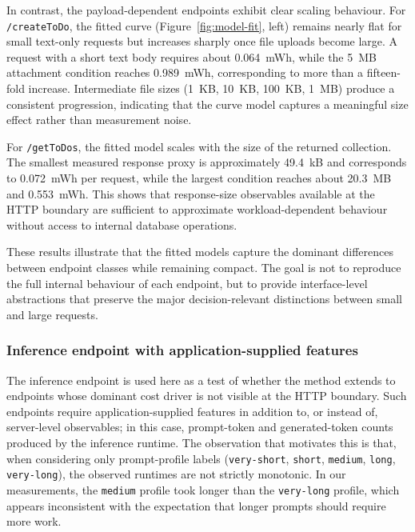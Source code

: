 \documentclass[sigconf]{acmart}
\begin{document}
In contrast, the payload-dependent endpoints exhibit clear scaling behaviour. For \texttt{/createToDo}, the fitted curve (Figure~\ref{fig:model-fit}, left) remains nearly flat for small text-only requests but increases sharply once file uploads become large. A request with a short text body requires about \SI{0.064}{mWh}, while the \SI{5}{MB} attachment condition reaches \SI{0.989}{mWh}, corresponding to more than a fifteen-fold increase. Intermediate file sizes (\SI{1}{KB}, \SI{10}{KB}, \SI{100}{KB}, \SI{1}{MB}) produce a consistent progression, indicating that the curve model captures a meaningful size effect rather than measurement noise.

For \texttt{/getToDos}, the fitted model scales with the size of the returned collection. The smallest measured response proxy is approximately \SI{49.4}{kB} and corresponds to \SI{0.072}{mWh} per request, while the largest condition reaches about \SI{20.3}{MB} and \SI{0.553}{mWh}. This shows that response-size observables available at the HTTP boundary are sufficient to approximate workload-dependent behaviour without access to internal database operations.

These results illustrate that the fitted models capture the dominant differences between endpoint classes while remaining compact. The goal is not to reproduce the full internal behaviour of each endpoint, but to provide interface-level abstractions that preserve the major decision-relevant distinctions between small and large requests.

\subsubsection{Inference endpoint with application-supplied features}
The inference endpoint is used here as a test of whether the method extends to endpoints whose dominant cost driver is not visible at the HTTP boundary. Such endpoints require application-supplied features in addition to, or instead of, server-level observables; in this case, prompt-token and generated-token counts produced by the inference runtime. The observation that motivates this is that, when considering only prompt-profile labels (\texttt{very-short}, \texttt{short}, \texttt{medium}, \texttt{long}, \texttt{very-long}), the observed runtimes are not strictly monotonic. In our measurements, the \texttt{medium} profile took longer than the \texttt{very-long} profile, which appears inconsistent with the expectation that longer prompts should require more work.
\end{document}
